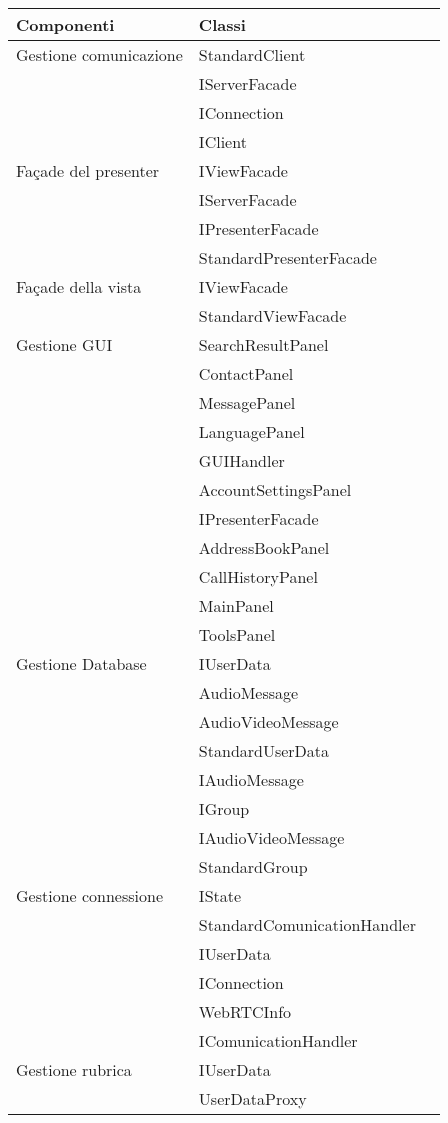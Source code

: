 \begin{center}
\begin{longtable}{lp{}l}
\toprule Componenti & Classi\\
\midrule
Gestione comunicazione & StandardClient \\
 & IServerFacade \\
 & IConnection \\
 & IClient \\
Façade del presenter & IViewFacade \\
 & IServerFacade \\
 & IPresenterFacade \\
 & StandardPresenterFacade \\
Façade della vista & IViewFacade \\
 & StandardViewFacade \\
Gestione GUI & SearchResultPanel \\
 & ContactPanel \\
 & MessagePanel \\
 & LanguagePanel \\
 & GUIHandler \\
 & AccountSettingsPanel \\
 & IPresenterFacade \\
 & AddressBookPanel \\
 & CallHistoryPanel \\
 & MainPanel \\
 & ToolsPanel \\
Gestione Database & IUserData \\
 & AudioMessage \\
 & AudioVideoMessage \\
 & StandardUserData \\
 & IAudioMessage \\
 & IGroup \\
 & IAudioVideoMessage \\
 & StandardGroup \\
Gestione connessione & IState \\
 & StandardComunicationHandler \\
 & IUserData \\
 & IConnection \\
 & WebRTCInfo \\
 & IComunicationHandler \\
Gestione rubrica & IUserData \\
 & UserDataProxy \\

\end{longtable}
\end{center}
